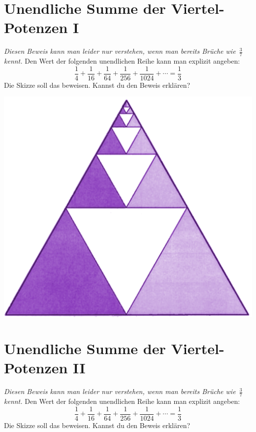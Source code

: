 \documentclass[a5paper,ngerman,landscape,11pt]{scrartcl}
\begin{document}
\section*{Unendliche Summe der Viertel-Potenzen I}
\emph{Diesen Beweis kann man leider nur verstehen, wenn man bereits Brüche
wie~$\frac{3}{7}$ kennt.}
Den Wert der folgenden unendlichen Reihe kann man
explizit angeben:
\[ \frac{1}{4} + \frac{1}{16} + \frac{1}{64} +
\frac{1}{256} + \frac{1}{1024} + \cdots = \frac{1}{3} \]
Die Skizze soll das beweisen. Kannst du den Beweis erklären?

\vfill
\begin{center}
\includegraphics[scale=0.3]{geometrische-reihe-1}
\end{center}


\vfill
\section*{Unendliche Summe der Viertel-Potenzen II}
\emph{Diesen Beweis kann man leider nur verstehen, wenn man bereits Brüche
wie~$\frac{3}{7}$ kennt.}
Den Wert der folgenden unendlichen Reihe kann man
explizit angeben:
\[ \frac{1}{4} + \frac{1}{16} + \frac{1}{64} +
\frac{1}{256} + \frac{1}{1024} + \cdots = \frac{1}{3} \]
Die Skizze soll das beweisen. Kannst du den Beweis erklären?
\end{document}
